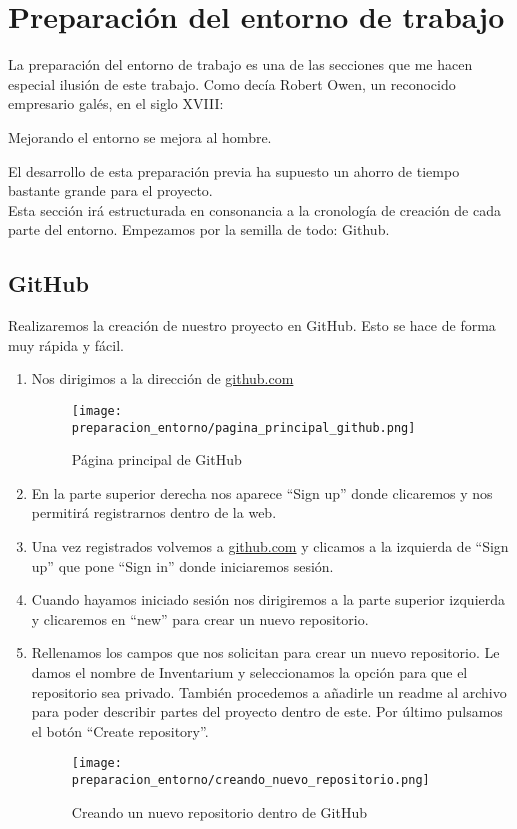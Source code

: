 \section{Preparación del entorno de trabajo}

La preparación del entorno de trabajo es una de las secciones que me hacen especial ilusión de este trabajo. Como decía Robert Owen, un reconocido empresario galés, en el siglo XVIII:

\begin{displayquote}
    Mejorando el entorno se mejora al hombre.
\end{displayquote}

El desarrollo de esta preparación previa ha supuesto un ahorro de tiempo bastante grande para el proyecto.
\\Esta sección irá estructurada en consonancia a la cronología de creación de cada parte del entorno. Empezamos por la semilla de todo: Github.

\subsection{GitHub}
Realizaremos la creación de nuestro proyecto en GitHub. Esto se hace de forma muy rápida y fácil.

\begin{enumerate}
    \item Nos dirigimos a la dirección de \url{github.com}
          \begin{figure}[htbp]
              \centering
              \texttt{[image: preparacion\_entorno/pagina\_principal\_github.png]}
              \caption{Página principal de GitHub}
          \end{figure}
    \item En la parte superior derecha nos aparece ``Sign up'' donde clicaremos y nos permitirá registrarnos dentro de la web.
    \item Una vez registrados volvemos a \url{github.com} y clicamos a la izquierda de ``Sign up'' que pone ``Sign in'' donde iniciaremos sesión.
    \item Cuando hayamos iniciado sesión nos dirigiremos a la parte superior izquierda y clicaremos en ``new'' para crear un nuevo repositorio.
    \item Rellenamos los campos que nos solicitan para crear un nuevo repositorio. Le damos el nombre de Inventarium y seleccionamos la opción para que el repositorio sea privado. También procedemos a añadirle un readme al archivo para poder describir partes del proyecto dentro de este. Por último pulsamos el botón ``Create repository''.
          \begin{figure}[htbp]
              \centering
              \texttt{[image: preparacion\_entorno/creando\_nuevo\_repositorio.png]}
              \caption{Creando un nuevo repositorio dentro de GitHub}
          \end{figure}
\end{enumerate}

